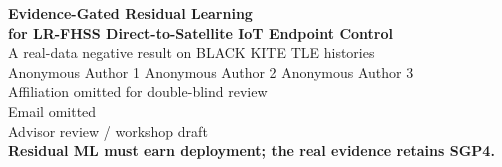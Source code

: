 \documentclass[aspectratio=169,10pt]{beamer}
\begin{document}
\begin{frame}[plain]
  \vspace{0.42cm}
  \begin{center}
    {\LARGE\bfseries Evidence-Gated Residual Learning}\\[2pt]
    {\LARGE\bfseries for LR-FHSS Direct-to-Satellite IoT Endpoint Control}\\[0.22cm]
    {\large A real-data negative result on BLACK KITE TLE histories}\\[0.38cm]
    {\normalsize Anonymous Author 1 \quad Anonymous Author 2 \quad Anonymous Author 3}\\[0.06cm]
    {\small Affiliation omitted for double-blind review}\\
    {\small Email omitted}\\[0.32cm]
    {\scriptsize Advisor review / workshop draft}\\[0.42cm]
    {\Large\bfseries Residual ML must earn deployment; the real evidence retains SGP4.}
  \end{center}
\end{frame}
\end{document}
